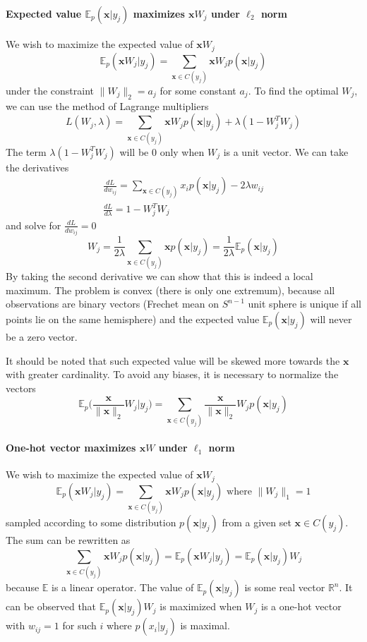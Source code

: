\documentclass[12pt]{article}
\begin{document}
\paragraph{Expected value $\mathbb{E}_{p}(\boldsymbol{x}|y_j)$ maximizes $\boldsymbol{x}W_j$ under $\ell_2$ norm} 

We wish to maximize the expected value of $\boldsymbol{x}W_j$
\[
\mathbb{E}_{p}(\boldsymbol{x}W_j|y_j)=\sum_{\boldsymbol{x}\in C(y_j)} \boldsymbol{x} W_j p(\boldsymbol{x}|y_j)
\]
 under the constraint $\lVert W_j \rVert_2 = a_j$ for some constant $a_j$.  To find the optimal $W_j$, we can use the method of Lagrange multipliers
\[
L(W_j,\lambda) = \sum_{\boldsymbol{x}\in C(y_j)} \boldsymbol{x} W_j p(\boldsymbol{x}|y_j) + \lambda(1- W_j^{T}W_j )
\]
The term $\lambda(1- W_j^{T}W_j)$ will be $0$ only when $W_j$ is a unit vector.
We can take the derivatives 
\begin{gather*}
	\frac{d L}{d w_{ij}} = \sum_{\boldsymbol{x}\in C(y_j)} x_i p(\boldsymbol{x}|y_j) - 2\lambda w_{ij} \\
	\frac{d L}{d \lambda} = 1 - W_j^{T}W_j
\end{gather*}
and solve for $\frac{d L}{d w_{ij}}=0$
\[
W_j = \frac{1}{2\lambda }\sum_{\boldsymbol{x}\in C(y_j)} \boldsymbol{x} p(\boldsymbol{x}|y_j)  = \frac{1}{2\lambda } \mathbb{E}_{p}(\boldsymbol{x}|y_j)
\]
By taking the second derivative we can show that this is indeed a local maximum.
The problem is convex (there is only one extremum), because all observations are binary vectors (Frechet mean on $S^{n-1}$ unit sphere is unique if all points lie on the same hemisphere) and the expected value $\mathbb{E}_{p}(\boldsymbol{x}|y_j)$ will never be a zero vector.

It should be noted that such expected value will be skewed more towards the $\boldsymbol{x}$ with greater cardinality. To avoid any biases, it is necessary to normalize the vectors 
\[
\mathbb{E}_{p}\big(\frac{\boldsymbol{x}}{\lVert \boldsymbol{x} \rVert_2}W_j|y_j \big)= \sum_{\boldsymbol{x}\in C(y_j)} \frac{\boldsymbol{x}}{\lVert \boldsymbol{x} \rVert_2} W_j p(\boldsymbol{x}|y_j)
\]


\paragraph{One-hot vector maximizes $\boldsymbol{x}W$ under $\ell_1$ norm}
We wish to maximize the expected value of $\boldsymbol{x}W_j$ 
\[
\mathbb{E}_{p}(\boldsymbol{x}W_j|y_j)=\sum_{\boldsymbol{x}\in C(y_j)} \boldsymbol{x} W_j p(\boldsymbol{x}|y_j) \text{ where } \lVert W_j \rVert_1=1
\]
sampled according to some distribution $p(\boldsymbol{x}|y_j)$ from a given set $\boldsymbol{x}\in C(y_j)$.  The sum can be rewritten as
\[
\sum_{\boldsymbol{x}\in C(y_j)} \boldsymbol{x} W_j p(\boldsymbol{x}|y_j) = \mathbb{E}_{p}(\boldsymbol{x} W_j|y_j) = \mathbb{E}_{p}(\boldsymbol{x}|y_j)W_j
\]
because $\mathbb{E}$ is a linear operator. The value of $\mathbb{E}_{p}(\boldsymbol{x}|y_j)$ is some real vector $\mathbb{R}^n$.  It can be observed that $\mathbb{E}_{p}(\boldsymbol{x}|y_j)W_j$ is maximized when $W_j$ is a one-hot vector with $w_{ij}=1$ for such $i$ where $p(x_i|y_j)$ is maximal. 
\end{document}
